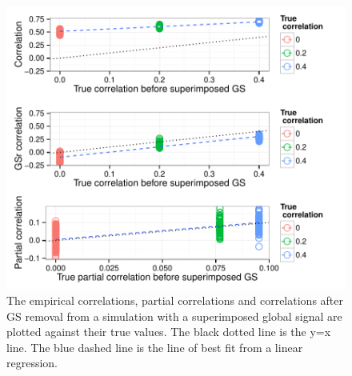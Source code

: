 \documentclass[a4paper]{article}\usepackage[]{graphicx}\usepackage[]{color}
\makeatletter
\def\maxwidth{ %
  \ifdim\Gin@nat@width>\linewidth
    \linewidth
  \else
    \Gin@nat@width
  \fi
}
\newenvironment{knitrout}{}{} %
\makeatother
\begin{document}
\begin{knitrout}
\color{fgcolor}\begin{figure}[]


{\centering \includegraphics[width=\maxwidth]{GSFigs/GSdotPlotGS} 

}

\caption[The empirical correlations, partial correlations and correlations after GS removal from a simulation with a superimposed global signal are plotted against their true values]{The empirical correlations, partial correlations and correlations after GS removal from a simulation with a superimposed global signal are plotted against their true values. The black dotted line is the y=x line. The blue dashed line is the line of best fit from a linear regression.\label{fig:dotPlotGS}}
\end{figure}


\end{knitrout}
\end{document}
